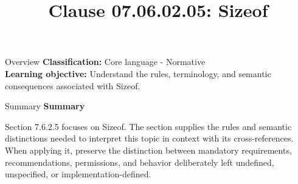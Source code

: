 \documentclass[10pt,letterpaper]{article}
\title{Clause 07.06.02.05: Sizeof}
\author{}
\date{}
\begin{document}
\maketitle
\begin{CornellOverviewBox}{Overview}
\textbf{Classification:} Core language - Normative\\[2pt]
\textbf{Learning objective:} Understand the rules, terminology, and semantic consequences associated with Sizeof.
\end{CornellOverviewBox}\begin{CornellSummaryBox}{Summary}
{\sffamily\bfseries\color{Accent} Summary}\par\vspace{3pt}Section 7.6.2.5 focuses on Sizeof. The section supplies the rules and semantic distinctions needed to interpret this topic in context with its cross-references. When applying it, preserve the distinction between mandatory requirements, recommendations, permissions, and behavior deliberately left undefined, unspecified, or implementation-defined.
\end{CornellSummaryBox}
\end{document}
